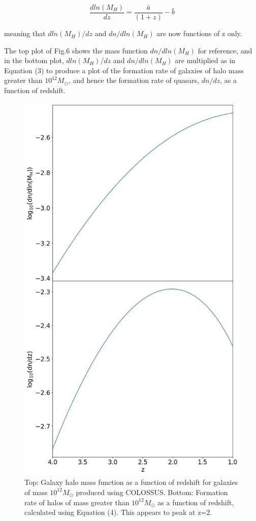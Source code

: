 \documentclass[12pt, twocolumn]{revtex4}    %
\begin{document}
\begin{equation}
    \frac{dln(M_H)}{dz}=\frac{\bar a}{(1+z)}-\bar b
\end{equation}

\noindent meaning that $dln(M_H)/dz$ and $dn/dln(M_H)$ are now functions of z only.\par

The top plot of Fig.6 shows the mass function $dn/dln(M_H)$ for reference, and in the bottom plot, $dln(M_H)/dz$ and $dn/dln(M_H)$ are multiplied as in Equation (3) to produce a plot of the formation rate of galaxies of halo mass greater than $10^{12}M_\odot$, and hence the formation rate of quasars, $dn/dz$, as a function of redshift.

\onecolumngrid


\begin{figure}[H]
\centering
\includegraphics[width=13cm]{Plot_6.jpeg}
\caption{Top: Galaxy halo mass function as a function of redshift for galaxies of mass $10^{12}M_\odot$ produced using COLOSSUS. Bottom: Formation rate of halos of mass greater than $10^{12}M_\odot$ as a function of redshift, calculated using Equation (4). This appears to peak at z=2.}
\label{fig:6}
\end{figure}
\twocolumngrid
 
\end{document}
